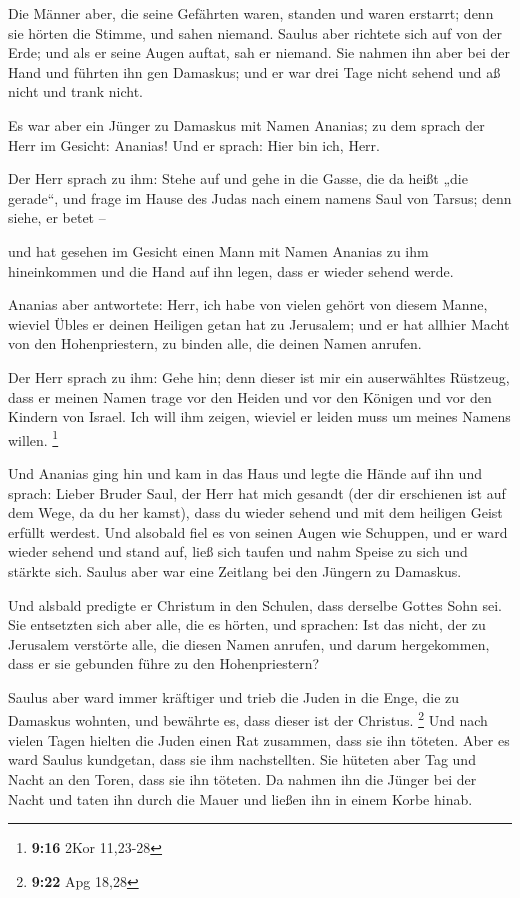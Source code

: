  Die Männer aber, die seine Gefährten waren, standen und
waren erstarrt; denn sie hörten die Stimme, und sahen niemand.
 Saulus aber richtete sich auf von der Erde; und als er
seine Augen auftat, sah er niemand. Sie nahmen ihn aber bei der Hand und
führten ihn gen Damaskus;  und er war drei Tage nicht
sehend und aß nicht und trank nicht.

 Es war aber ein Jünger zu Damaskus mit Namen Ananias; zu
dem sprach der Herr im Gesicht: Ananias! Und er sprach: Hier bin ich,
Herr.

 Der Herr sprach zu ihm: Stehe auf und gehe in die Gasse,
die da heißt „die gerade``, und frage im Hause des Judas nach einem
namens Saul von Tarsus; denn siehe, er betet --

 und hat gesehen im Gesicht einen Mann mit Namen Ananias
zu ihm hineinkommen und die Hand auf ihn legen, dass er wieder sehend
werde.

 Ananias aber antwortete: Herr, ich habe von vielen
gehört von diesem Manne, wieviel Übles er deinen Heiligen getan hat zu
Jerusalem;  und er hat allhier Macht von den
Hohenpriestern, zu binden alle, die deinen Namen anrufen.

 Der Herr sprach zu ihm: Gehe hin; denn dieser ist mir
ein auserwähltes Rüstzeug, dass er meinen Namen trage vor den Heiden und
vor den Königen und vor den Kindern von Israel.  Ich will
ihm zeigen, wieviel er leiden muss um meines Namens willen. \footnote{\textbf{9:16}
  2Kor 11,23-28}

 Und Ananias ging hin und kam in das Haus und legte die
Hände auf ihn und sprach: Lieber Bruder Saul, der Herr hat mich gesandt
(der dir erschienen ist auf dem Wege, da du her kamst), dass du wieder
sehend und mit dem heiligen Geist erfüllt werdest.  Und
alsobald fiel es von seinen Augen wie Schuppen, und er ward wieder
sehend  und stand auf, ließ sich taufen und nahm Speise
zu sich und stärkte sich. Saulus aber war eine Zeitlang bei den Jüngern
zu Damaskus.

 Und alsbald predigte er Christum in den Schulen, dass
derselbe Gottes Sohn sei.  Sie entsetzten sich aber alle,
die es hörten, und sprachen: Ist das nicht, der zu Jerusalem verstörte
alle, die diesen Namen anrufen, und darum hergekommen, dass er sie
gebunden führe zu den Hohenpriestern?

 Saulus aber ward immer kräftiger und trieb die Juden in
die Enge, die zu Damaskus wohnten, und bewährte es, dass dieser ist der
Christus. \footnote{\textbf{9:22} Apg 18,28}  Und nach
vielen Tagen hielten die Juden einen Rat zusammen, dass sie ihn töteten.
 Aber es ward Saulus kundgetan, dass sie ihm
nachstellten. Sie hüteten aber Tag und Nacht an den Toren, dass sie ihn
töteten.  Da nahmen ihn die Jünger bei der Nacht und
taten ihn durch die Mauer und ließen ihn in einem Korbe hinab.

